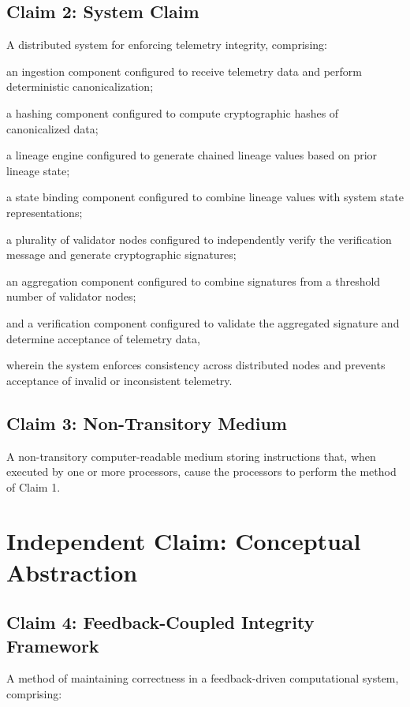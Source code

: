 \subsection{Claim 2: System Claim}

A distributed system for enforcing telemetry integrity, comprising:

an ingestion component configured to receive telemetry data and perform deterministic canonicalization;

a hashing component configured to compute cryptographic hashes of canonicalized data;

a lineage engine configured to generate chained lineage values based on prior lineage state;

a state binding component configured to combine lineage values with system state representations;

a plurality of validator nodes configured to independently verify the verification message and generate cryptographic signatures;

an aggregation component configured to combine signatures from a threshold number of validator nodes;

and a verification component configured to validate the aggregated signature and determine acceptance of telemetry data,

wherein the system enforces consistency across distributed nodes and prevents acceptance of invalid or inconsistent telemetry.

\subsection{Claim 3: Non-Transitory Medium}

A non-transitory computer-readable medium storing instructions that, when executed by one or more processors, cause the processors to perform the method of Claim 1.

\section{Independent Claim: Conceptual Abstraction}

\subsection{Claim 4: Feedback-Coupled Integrity Framework}

A method of maintaining correctness in a feedback-driven computational system, comprising:


